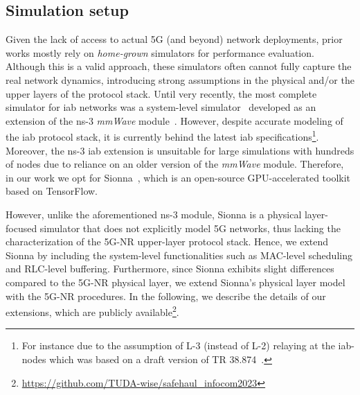 \subsection{Simulation setup}
\label{s:simulation_setup}
Given the lack of access to actual 5G (and beyond) network deployments, prior works mostly rely on \textit{home-grown} simulators for performance evaluation. Although this is a valid approach, these simulators often cannot fully capture the real network dynamics, introducing strong assumptions in the physical and/or the upper layers of the protocol stack. 
Until very recently, the most complete  simulator for \gls{iab} networks was a system-level simulator~\cite{8514996} developed as an extension of the ns-3 \textit{mmWave} module~\cite{8344116}. However, despite accurate modeling of the \gls{iab} protocol stack, it is currently behind the latest \gls{iab} specifications\footnote{For instance due to the assumption of L-3 (instead of L-2) relaying at the \gls{iab}-nodes which was based on a draft version of TR 38.874~\cite{3gpp_38_874_old}.}. Moreover, the ns-3 \gls{iab} extension is unsuitable for large simulations with hundreds of nodes due to reliance on an older version of the \textit{mmWave} module. Therefore, in our work we opt for Sionna~\cite{hoydis2022sionna}, which is an open-source GPU-accelerated toolkit based on TensorFlow. 

However, unlike the aforementioned ns-3 module, Sionna is a physical layer-focused simulator that does not explicitly model 5G networks, thus lacking  the characterization of the 5G-NR upper-layer protocol stack. Hence, we extend Sionna by including the system-level functionalities such as MAC-level scheduling and RLC-level buffering. Furthermore, since Sionna exhibits slight differences compared to the 5G-NR physical layer, we extend Sionna's physical layer model~\cite{hoydis2022sionna} with the 5G-NR procedures. In the following, we describe the details of our extensions, which are publicly available\footnote{\url{https://github.com/TUDA-wise/safehaul_infocom2023}}.


